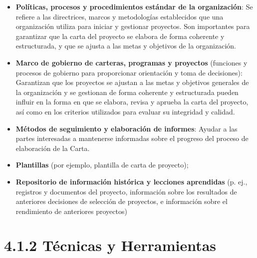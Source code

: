 \documentclass[letterpaper,12pt,openright,oneside]{article}
\theoremstyle{plain}
\begin{document}
\begin{itemize}
    \item \textbf{Políticas, procesos y procedimientos estándar de la organización}: Se refiere a las directrices, marcos y metodologías establecidos que una organización utiliza para iniciar y gestionar proyectos. Son importantes para garantizar que la carta del proyecto se elabora de forma coherente y estructurada, y que se ajusta a las metas y objetivos de la organización.
    \item \textbf{Marco de gobierno de carteras, programas y proyectos} (funciones y procesos de gobierno para proporcionar orientación y toma de decisiones): Garantizan que los proyectos se ajustan a las metas y objetivos generales de la organización y se gestionan de forma coherente y estructurada pueden influir en la forma en que se elabora, revisa y aprueba la carta del proyecto, así como en los criterios utilizados para evaluar su integridad y calidad.
    \item \textbf{Métodos de seguimiento y elaboración de informes}: Ayudar a las partes interesadas a mantenerse informadas sobre el progreso del proceso de elaboración de la Carta.
    \item \textbf{Plantillas} (por ejemplo, plantilla de carta de proyecto);
    \item \textbf{Repositorio de información histórica y lecciones aprendidas} (p. ej., registros y documentos del proyecto, información sobre los resultados de anteriores decisiones de selección de proyectos, e información sobre el rendimiento de anteriores proyectos)
\end{itemize}

%  
%  
\section*{4.1.2 Técnicas y Herramientas}

% 
%
\end{document}
